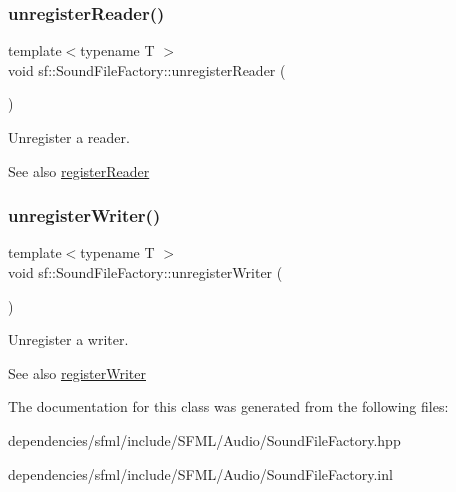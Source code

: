 \subsubsection{\texorpdfstring{unregister\+Reader()}{unregisterReader()}}
{\footnotesize\ttfamily template$<$typename T $>$ \\
void sf\+::\+Sound\+File\+Factory\+::unregister\+Reader (\begin{DoxyParamCaption}{ }\end{DoxyParamCaption})\hspace{0.3cm}{\ttfamily [static]}}



Unregister a reader. 

\begin{DoxySeeAlso}{See also}
\hyperlink{classsf_1_1_sound_file_factory_acaf1f0bf1b7c7b9988ec76b33e33fe95}{register\+Reader} 
\end{DoxySeeAlso}
\mbox{\label{classsf_1_1_sound_file_factory_a2306f90d1f72e474732e4bcceeb34215}} 
\subsubsection{\texorpdfstring{unregister\+Writer()}{unregisterWriter()}}
{\footnotesize\ttfamily template$<$typename T $>$ \\
void sf\+::\+Sound\+File\+Factory\+::unregister\+Writer (\begin{DoxyParamCaption}{ }\end{DoxyParamCaption})\hspace{0.3cm}{\ttfamily [static]}}



Unregister a writer. 

\begin{DoxySeeAlso}{See also}
\hyperlink{classsf_1_1_sound_file_factory_a3a59140e6ccf1f252f721b790eddd661}{register\+Writer} 
\end{DoxySeeAlso}


The documentation for this class was generated from the following files\+:\begin{DoxyCompactItemize}
\item 
dependencies/sfml/include/\+S\+F\+M\+L/\+Audio/Sound\+File\+Factory.\+hpp\item 
dependencies/sfml/include/\+S\+F\+M\+L/\+Audio/Sound\+File\+Factory.\+inl\end{DoxyCompactItemize}
